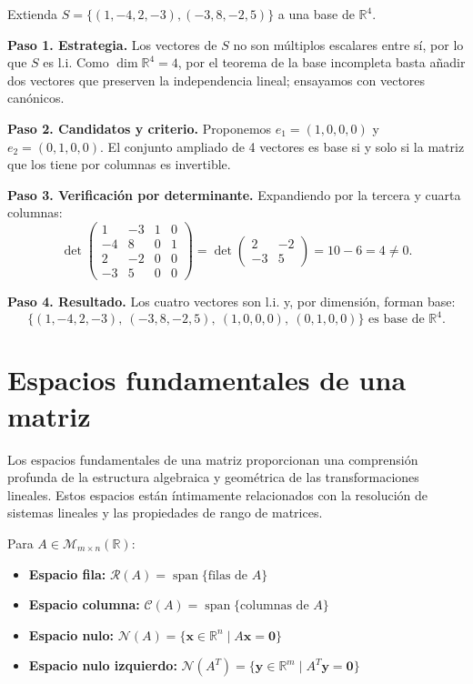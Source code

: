 \begin{example}
Extienda $S=\{(1,-4,2,-3), (-3,8,-2,5)\}$ a una base de $\mathbb{R}^4$.

\begin{myproof}
\textbf{Paso 1. Estrategia.} Los vectores de $S$ no son múltiplos escalares entre sí, por lo que $S$ es l.i. Como $\dim \mathbb{R}^4=4$, por el teorema de la base incompleta basta añadir dos vectores que preserven la independencia lineal; ensayamos con vectores canónicos.

\textbf{Paso 2. Candidatos y criterio.} Proponemos $e_1=(1,0,0,0)$ y $e_2=(0,1,0,0)$. El conjunto ampliado de 4 vectores es base si y solo si la matriz que los tiene por columnas es invertible.

\textbf{Paso 3. Verificación por determinante.} Expandiendo por la tercera y cuarta columnas:
$$\det \begin{pmatrix}
1 & -3 & 1 & 0 \\
-4 & 8 & 0 & 1 \\
2 & -2 & 0 & 0 \\
-3 & 5 & 0 & 0
\end{pmatrix}= \det\begin{pmatrix} 2 & -2 \\ -3 & 5 \end{pmatrix} = 10-6 = 4 \neq 0.$$

\textbf{Paso 4. Resultado.} Los cuatro vectores son l.i. y, por dimensión, forman base:
$$\boxed{\{(1,-4,2,-3),\ (-3,8,-2,5),\ (1,0,0,0),\ (0,1,0,0)\} \text{ es base de } \mathbb{R}^4.}$$
\end{myproof}
\end{example}

\section{Espacios fundamentales de una matriz}

Los espacios fundamentales de una matriz proporcionan una comprensión profunda de la estructura algebraica y geométrica de las transformaciones lineales. Estos espacios están íntimamente relacionados con la resolución de sistemas lineales y las propiedades de rango de matrices.

\begin{definition}
Para $A \in \mathcal{M}_{m \times n}(\mathbb{R})$:
\begin{itemize}
    \item \textbf{Espacio fila:} $\mathcal{R}(A) = \operatorname{span}\{\text{filas de } A\}$
    \item \textbf{Espacio columna:} $\mathcal{C}(A) = \operatorname{span}\{\text{columnas de } A\}$
    \item \textbf{Espacio nulo:} $\mathcal{N}(A) = \{ \mathbf{x} \in \mathbb{R}^n \mid A\mathbf{x} = \mathbf{0} \}$
    \item \textbf{Espacio nulo izquierdo:} $\mathcal{N}(A^T) = \{ \mathbf{y} \in \mathbb{R}^m \mid A^T\mathbf{y} = \mathbf{0} \}$
\end{itemize}
\end{definition}

